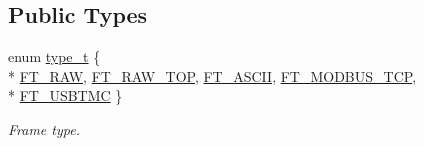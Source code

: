 \subsection*{Public Types}
\begin{DoxyCompactItemize}
\item 
enum \hyperlink{classmdt_frame_af936e37d5fe4c066c0fb0161fafd4a17}{type\-\_\-t} \{ \\*
\hyperlink{classmdt_frame_af936e37d5fe4c066c0fb0161fafd4a17aeb10e33f775c33799273fcb130fee86f}{F\-T\-\_\-\-R\-A\-W}, 
\hyperlink{classmdt_frame_af936e37d5fe4c066c0fb0161fafd4a17ac91a1c1827fa634eadaddb861f805c96}{F\-T\-\_\-\-R\-A\-W\-\_\-\-T\-O\-P}, 
\hyperlink{classmdt_frame_af936e37d5fe4c066c0fb0161fafd4a17ac649559564652abbe656b97d4a84b722}{F\-T\-\_\-\-A\-S\-C\-I\-I}, 
\hyperlink{classmdt_frame_af936e37d5fe4c066c0fb0161fafd4a17a72c8ddaf29839f4037b686bdc346828a}{F\-T\-\_\-\-M\-O\-D\-B\-U\-S\-\_\-\-T\-C\-P}, 
\\*
\hyperlink{classmdt_frame_af936e37d5fe4c066c0fb0161fafd4a17aca438ff6b553a819f22090facc562c86}{F\-T\-\_\-\-U\-S\-B\-T\-M\-C}
 \}
\begin{DoxyCompactList}\small\item\em Frame type. \end{DoxyCompactList}\end{DoxyCompactItemize}
